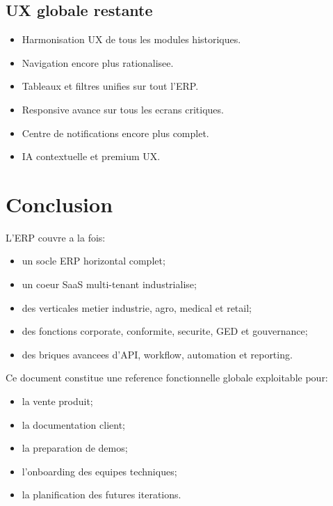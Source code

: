 \documentclass[11pt,a4paper]{article}
\begin{document}
\subsection{UX globale restante}
\begin{itemize}[leftmargin=1.2cm]
    \item Harmonisation UX de tous les modules historiques.
    \item Navigation encore plus rationalisee.
    \item Tableaux et filtres unifies sur tout l'ERP.
    \item Responsive avance sur tous les ecrans critiques.
    \item Centre de notifications encore plus complet.
    \item IA contextuelle et premium UX.
\end{itemize}

\section{Conclusion}
L'ERP couvre a la fois:
\begin{itemize}[leftmargin=1.2cm]
    \item un socle ERP horizontal complet;
    \item un coeur SaaS multi-tenant industrialise;
    \item des verticales metier industrie, agro, medical et retail;
    \item des fonctions corporate, conformite, securite, GED et gouvernance;
    \item des briques avancees d'API, workflow, automation et reporting.
\end{itemize}

Ce document constitue une reference fonctionnelle globale exploitable pour:
\begin{itemize}[leftmargin=1.2cm]
    \item la vente produit;
    \item la documentation client;
    \item la preparation de demos;
    \item l'onboarding des equipes techniques;
    \item la planification des futures iterations.
\end{itemize}
\end{document}

